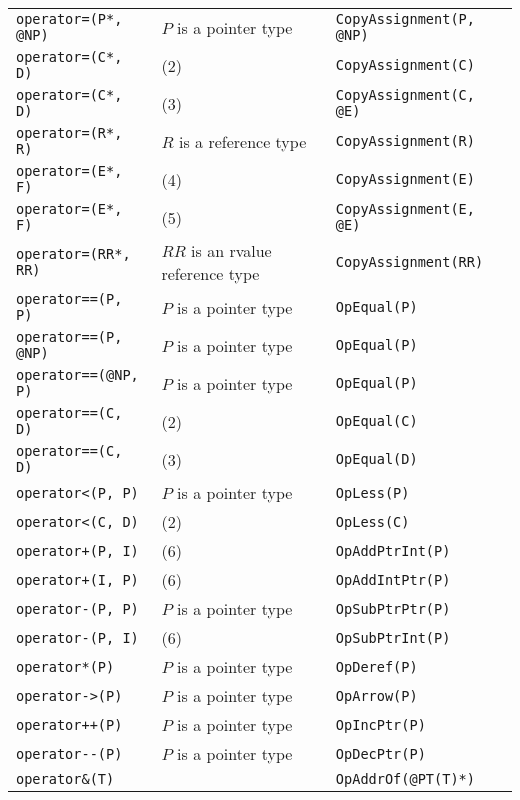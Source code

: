 \documentclass[a4paper,oneside,11pt]{book}
\theoremstyle{definition}
\begin{document}
\begin{flushleft}
\begin{supertabular}{lll}
\verb|operator=(P*, @NP)|& $P$ is a pointer type & \verb|CopyAssignment(P, @NP)|\\
\verb|operator=(C*, D)|& (2)& \verb|CopyAssignment(C)|\\
\verb|operator=(C*, D)|& (3)& \verb|CopyAssignment(C, @E)|\\
\verb|operator=(R*, R)|& $R$ is a reference type& \verb|CopyAssignment(R)|\\
\verb|operator=(E*, F)|& (4)& \verb|CopyAssignment(E)|\\
\verb|operator=(E*, F)|& (5)& \verb|CopyAssignment(E, @E)|\\
\verb|operator=(RR*, RR)|& $RR$ is an rvalue reference type& \verb|CopyAssignment(RR)|\\
\verb|operator==(P, P)|& $P$ is a pointer type& \verb|OpEqual(P)|\\
\verb|operator==(P, @NP)|& $P$ is a pointer type& \verb|OpEqual(P)|\\
\verb|operator==(@NP, P)|& $P$ is a pointer type& \verb|OpEqual(P)|\\
\verb|operator==(C, D)|& (2)& \verb|OpEqual(C)|\\
\verb|operator==(C, D)|& (3)& \verb|OpEqual(D)|\\
\verb|operator<(P, P)|& $P$ is a pointer type& \verb|OpLess(P)|\\
\verb|operator<(C, D)|& (2)& \verb|OpLess(C)|\\
\verb|operator+(P, I)|& (6)& \verb|OpAddPtrInt(P)|\\
\verb|operator+(I, P)|& (6)& \verb|OpAddIntPtr(P)|\\
\verb|operator-(P, P)|& $P$ is a pointer type& \verb|OpSubPtrPtr(P)|\\
\verb|operator-(P, I)|& (6)& \verb|OpSubPtrInt(P)|\\
\verb|operator*(P)|& $P$ is a pointer type& \verb|OpDeref(P)|\\
\verb|operator->(P)|& $P$ is a pointer type& \verb|OpArrow(P)|\\
\verb|operator++(P)|& $P$ is a pointer type& \verb|OpIncPtr(P)|\\
\verb|operator--(P)|& $P$ is a pointer type& \verb|OpDecPtr(P)|\\
\verb|operator&(T)|& & \verb|OpAddrOf(@PT(T)*)|\\
\hline
\end{supertabular}
\end{flushleft}
\end{document}
